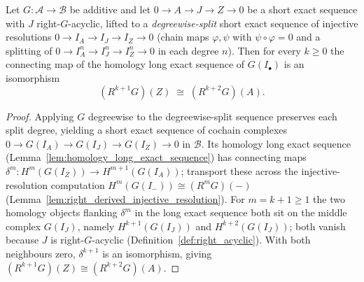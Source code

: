 \begin{lemma}
  \label{lem:right_derived_shift_split_resolution}
  Let \(G : \mathcal{A} \to \mathcal{B}\) be additive and let
  \(0 \to A \to J \to Z \to 0\) be a short exact sequence with \(J\) right-\(G\)-acyclic,
  lifted to a \emph{degreewise-split} short exact sequence of injective resolutions
  \(0 \to I_A \to I_J \to I_Z \to 0\) (chain maps \(\varphi, \psi\) with
  \(\psi \circ \varphi = 0\) and a splitting of \(0 \to I_A^n \to I_J^n \to I_Z^n \to 0\)
  in each degree \(n\)). Then for every \(k \geq 0\) the connecting map of the homology
  long exact sequence of \(G(I_\bullet)\) is an isomorphism
  \[
    (R^{k+1} G)(Z) \;\cong\; (R^{k+2} G)(A).
  \]
\end{lemma}

\begin{proof}
  Applying \(G\) degreewise to the degreewise-split sequence preserves each split
  degree, yielding a short exact sequence of cochain complexes
  \(0 \to G(I_A) \to G(I_J) \to G(I_Z) \to 0\) in \(\mathcal{B}\). Its homology long
  exact sequence (Lemma~\ref{lem:homology_long_exact_sequence}) has connecting maps
  \(\delta^m : H^m(G(I_Z)) \to H^{m+1}(G(I_A))\); transport these across the
  injective-resolution computation \(H^m(G(I_-)) \cong (R^m G)(-)\)
  (Lemma~\ref{lem:right_derived_injective_resolution}). For \(m = k+1 \geq 1\) the two
  homology objects flanking \(\delta^m\) in the long exact sequence both sit on the
  middle complex \(G(I_J)\), namely \(H^{k+1}(G(I_J))\) and \(H^{k+2}(G(I_J))\); both
  vanish because \(J\) is right-\(G\)-acyclic (Definition~\ref{def:right_acyclic}).
  With both neighbours zero, \(\delta^{k+1}\) is an isomorphism, giving
  \((R^{k+1} G)(Z) \cong (R^{k+2} G)(A)\).
\end{proof}

